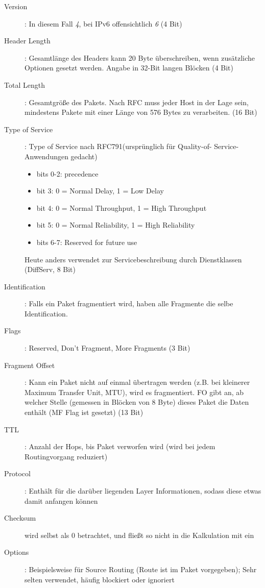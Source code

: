 \documentclass{article} %
\begin{document}
\begin{description}
	\item [Version]: In diesem Fall \emph{4}, bei IPv6 offensichtlich \emph{6} (4 Bit)
	\item [Header Length]: Gesamtlänge des Headers kann 20 Byte überschreiben, wenn zusätzliche Optionen gesetzt werden. Angabe in 32-Bit langen Blöcken (4 Bit)
	\item [Total Length]: Gesamtgröße des Pakets. Nach RFC muss jeder Host in der Lage sein, mindestens Pakete mit einer Länge von 576 Bytes zu verarbeiten. (16 Bit)
	\item [Type of Service]: Type of Service nach RFC791(ursprünglich für Quality-of-	Service-Anwendungen gedacht)
	
	\begin{itemize}
		\item bits 0-2: precedence
		\item bit 3: 0 = Normal Delay, 1 = Low Delay
		\item bit 4: 0 = Normal Throughput, 1 = High Throughput
		\item bit 5: 0 = Normal Reliability, 1 = High Reliability
		\item bits 6-7: Reserved for future use
	\end{itemize}
	Heute anders verwendet zur Servicebeschreibung durch Dienstklassen (DiffServ, 8 Bit)
	\item [Identification]: Falls ein Paket fragmentiert wird, haben alle Fragmente die	selbe Identification.
	\item [Flags]: Reserved\cite{rfc3514}, Don't Fragment, More Fragments (3 Bit)
	\item [Fragment Offset]: Kann ein Paket nicht auf einmal übertragen werden (z.B. bei
	kleinerer Maximum Transfer Unit, MTU), wird es fragmentiert.
	FO gibt an, ab welcher Stelle (gemessen in Blöcken von 8 Byte)
	dieses Paket die Daten enthält (MF Flag ist gesetzt) (13 Bit)
	\item[TTL]: Anzahl der Hops, bis Paket verworfen wird (wird bei jedem Routingvorgang reduziert)
	\item[Protocol]: Enthält für die darüber liegenden Layer Informationen, \glqq sodass diese etwas damit anfangen können\grqq
	\item[Checksum] wird selbst als 0 betrachtet, und fließt so nicht in die Kalkulation mit ein
	\item [Options]: Beispielsweise für Source Routing (Route ist im Paket vorgegeben); Sehr selten verwendet, häufig blockiert oder ignoriert
\end{description}
\end{document}
